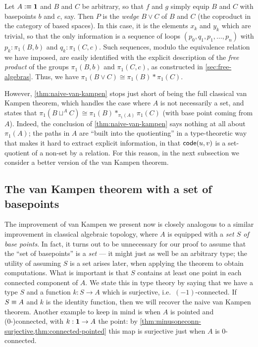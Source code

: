 \begin{eg}\label{eg:wedge}
  Let $A\vcentcolon\equiv\mathbf{1}$ and $B$ and $C$ be arbitrary, so that $f$ and $g$ simply equip $B$ and $C$ with basepoints $b$ and $c$, say.
  Then $P$ is the \emph{wedge} $B\vee C$ of $B$ and $C$ (the coproduct in the category of based spaces).
  In this case, it is the elements $x_k$ and $y_k$ which are trivial, so that the only information is a sequence of loops $(p_0,q_1,p_1,\dots,p_n)$ with $p_k:\pi_1(B,b)$ and $q_k:\pi_1(C,c)$.
  Such sequences, modulo the equivalence relation we have imposed, are easily identified with the explicit description of the \emph{free product} of the groups $\pi_1(B,b)$ and $\pi_1(C,c)$, as constructed in \cref{sec:free-algebras}.
  Thus, we have $\pi_1(B\vee C) \cong \pi_1(B) * \pi_1(C)$.
\end{eg}

%

However, \cref{thm:naive-van-kampen} stops just short of being the full classical van Kampen theorem, which handles
the case where $A$ is not necessarily a set,
and states that $\pi_1(B\sqcup^A C) \cong \pi_1(B) *_{\pi_1(A)} \pi_1(C)$ (with base point coming from $A$).
Indeed, the conclusion of \cref{thm:naive-van-kampen} says nothing at all about $\pi_1(A)$; the paths in $A$ are ``built into the quotienting'' in a type-theoretic way that makes it hard to extract explicit information, in that $\mathsf{code}(u,v)$ is a set-quotient of a non-set by a relation.
For this reason, in the next subsection we consider a better version of the van Kampen theorem.


\subsection{The van Kampen theorem with a set of basepoints}
\label{sec:better-vankampen}

%
The improvement of van Kampen we present now is closely analogous to a similar improvement in classical algebraic topology, where $A$ is equip\-ped with a \emph{set $S$ of base points}.
In fact, it turns out to be unnecessary for our proof to assume that the ``set of basepoints'' is a \emph{set} --- it might just as well be an arbitrary type; the utility of assuming $S$ is a set arises later, when applying the theorem to obtain computations.
What is important is that $S$ contains at least one point in each connected component of $A$.
We state this in type theory by saying that we have a type $S$ and a function $k:S \to A$ which is surjective, i.e.\ $(-1)$-connected.
If $S\equiv A$ and $k$ is the identity function, then we will recover the naive van Kampen theorem.
Another example to keep in mind is when $A$ is pointed and (0-)connected, with $k:\mathbf{1}\to A$ the point: by \cref{thm:minusoneconn-surjective,thm:connected-pointed} this map is surjective just when $A$ is 0-connected.

